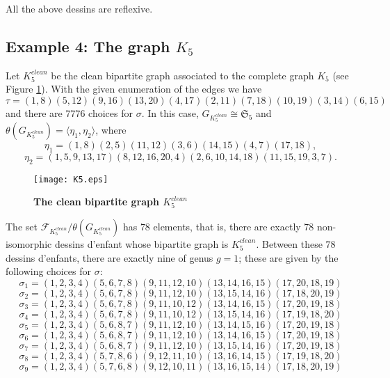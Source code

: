 \documentclass[12pt]{amsart}
\theoremstyle{remark}
\begin{document}
All the above dessins are reflexive.

\subsection{Example 4: The graph $K_{5}$}
Let $K_{5}^{clean}$ be the clean bipartite graph associated to the complete graph $K_{5}$ (see Figure \ref{FigK5}). With the given enumeration of the edges we have 
$$\tau=(1,8)(5,12)(9,16)(13,20)(4,17)(2,11)(7,18)(10,19)(3,14)(6,15)$$
and there are $7776$ choices for $\sigma$. In this case, $G_{K_{5}^{clean}}\cong {\mathfrak S}_{5}$ and $\theta(G_{K_{5}^{clean}})=\langle \eta_{1}, \eta_{2} \rangle$,
where $$\eta_{1}=(1,8)(2,5)(11,12)(3,6)(14,15)(4,7)(17,18),$$
$$\eta_{2}=(1,5,9,13,17)(8,12,16,20,4)(2,6,10,14,18)(11,15,19,3,7).$$

\begin{figure}[htbp]
\begin{center}
\texttt{[image: K5.eps]}
\caption{{\bf The clean bipartite graph $K_{5}^{clean}$}}
\label{FigK5}
\end{center}
\end{figure}

The set ${\mathcal F}_{K_{5}^{clean}}/\theta(G_{K_{5}^{clean}})$ has $78$ elements, that is, there are exactly $78$ non-isomorphic dessins d'enfant whose bipartite graph is $K_{5}^{clean}$. 
Between these $78$ dessins d'enfants, there are exactly nine of genus $g=1$; these are given by the following choices for $\sigma$:
$$\sigma_{1}=(1,2,3,4)(5,6,7,8)(9,11,12,10)(13,14,16,15)(17,20,18,19)$$
$$\sigma_{2}=(1,2,3,4)(5,6,7,8)(9,11,12,10)(13,15,14,16)(17,18,20,19)$$
$$\sigma_{3}=(1,2,3,4)(5,6,7,8)(9,11,10,12)(13,14,16,15)(17,20,19,18)$$
$$\sigma_{4}=(1,2,3,4)(5,6,7,8)(9,11,10,12)(13,15,14,16)(17,19,18,20)$$
$$\sigma_{5}=(1,2,3,4)(5,6,8,7)(9,11,12,10)(13,14,15,16)(17,20,19,18)$$
$$\sigma_{6}=(1,2,3,4)(5,6,8,7)(9,11,12,10)(13,14,16,15)(17,20,19,18)$$
$$\sigma_{7}=(1,2,3,4)(5,6,8,7)(9,11,12,10)(13,15,14,16)(17,20,19,18)$$
$$\sigma_{8}=(1,2,3,4)(5,7,8,6)(9,12,11,10)(13,16,14,15)(17,19,18,20)$$
$$\sigma_{9}=(1,2,3,4)(5,7,6,8)(9,12,10,11)(13,16,15,14)(17,18,20,19)$$
\end{document}
